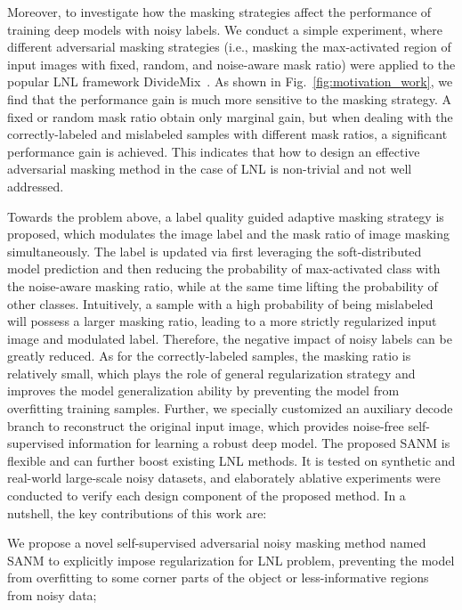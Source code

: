 \documentclass[10pt,twocolumn,letterpaper]{article}
\begin{document}
Moreover, {to investigate how the masking strategies affect the performance of training deep models with noisy labels. We conduct a simple experiment, where different adversarial masking strategies (i.e., masking the max-activated region of input images with fixed, random, and noise-aware mask ratio) were applied to the popular LNL framework DivideMix~\cite{li2020dividemix}.} As shown in Fig.~\ref{fig:motivation_work}, we find that the performance {gain} is much more sensitive to the masking strategy. {A fixed or random mask ratio obtain only marginal gain, but when dealing with the correctly-labeled and mislabeled samples with different mask ratios, a significant performance gain is achieved. This indicates that how to design an effective adversarial masking method in the case of LNL is non-trivial and not well addressed.}



{Towards the problem above, a label quality guided adaptive masking strategy is proposed,} which modulates the {image label and the mask ratio of image masking simultaneously}. {The label is updated via first leveraging the soft-distributed model prediction and then reducing the probability of max-activated class with the noise-aware masking ratio, while at the same time lifting the probability of other classes.}
Intuitively, a sample with a high probability of being mislabeled will possess a larger masking ratio, leading to a more strictly regularized input image and modulated label. Therefore, the negative impact of noisy labels can be greatly reduced. As for the correctly-labeled samples, the masking ratio is relatively small, which plays the role of general regularization strategy and improves the model generalization ability by preventing the model from overfitting training samples. Further, we {specially customized} an auxiliary decode branch to reconstruct the original input image, which provides noise-free self-supervised information for learning a robust deep model. The proposed SANM is flexible and can further boost existing LNL methods. It is tested on synthetic and real-world large-scale noisy datasets, and elaborately ablative experiments were conducted to verify each design component of the proposed method. In a nutshell, the key contributions of this work are:

 We propose a novel self-supervised adversarial noisy masking method named SANM to explicitly impose regularization {for LNL problem}, preventing the model from overfitting to {some corner parts of the object or less-informative regions from noisy data;}
\end{document}
